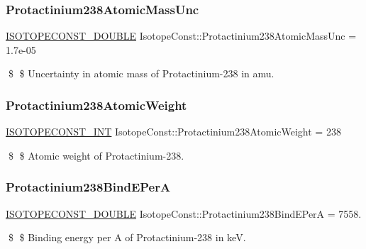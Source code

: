 \subsubsection{\texorpdfstring{Protactinium238\+Atomic\+Mass\+Unc}{Protactinium238AtomicMassUnc}}
{\footnotesize\ttfamily \mbox{\hyperlink{group___isotope_const-_macros_ga8f45a7272ce02c0b4c65c44636ed719a}{I\+S\+O\+T\+O\+P\+E\+C\+O\+N\+S\+T\+\_\+\+D\+O\+U\+B\+LE}} Isotope\+Const\+::\+Protactinium238\+Atomic\+Mass\+Unc = 1.\+7e-\/05}

\$ \$ Uncertainty in atomic mass of Protactinium-\/238 in amu. \mbox{\label{group___isotope_const-_protactinium-_pa238_gaad1f3c8d960bc2402a471b1d278ee3ad}} 
\subsubsection{\texorpdfstring{Protactinium238\+Atomic\+Weight}{Protactinium238AtomicWeight}}
{\footnotesize\ttfamily \mbox{\hyperlink{group___isotope_const-_macros_ga5f18360b3e99483a35c32d789e62621c}{I\+S\+O\+T\+O\+P\+E\+C\+O\+N\+S\+T\+\_\+\+I\+NT}} Isotope\+Const\+::\+Protactinium238\+Atomic\+Weight = 238}

\$ \$ Atomic weight of Protactinium-\/238. \mbox{\label{group___isotope_const-_protactinium-_pa238_ga560a5d0b05897efd8c5e90ec90557715}} 
\subsubsection{\texorpdfstring{Protactinium238\+Bind\+E\+PerA}{Protactinium238BindEPerA}}
{\footnotesize\ttfamily \mbox{\hyperlink{group___isotope_const-_macros_ga8f45a7272ce02c0b4c65c44636ed719a}{I\+S\+O\+T\+O\+P\+E\+C\+O\+N\+S\+T\+\_\+\+D\+O\+U\+B\+LE}} Isotope\+Const\+::\+Protactinium238\+Bind\+E\+PerA = 7558.}

\$ \$ Binding energy per A of Protactinium-\/238 in keV. \mbox{\label{group___isotope_const-_protactinium-_pa238_ga8270791aba4f1ed7661109de40b6344f}} 
